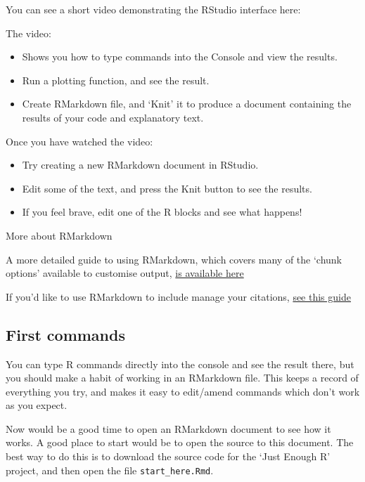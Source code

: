 \documentclass[]{article}
\providecommand{\tightlist}{%
  \setlength{\itemsep}{0pt}\setlength{\parskip}{0pt}}
\theoremstyle{definition}
\theoremstyle{definition}
\theoremstyle{definition}
\theoremstyle{remark}
\begin{document}
You can see a short video demonstrating the RStudio interface here:

The video:

\begin{itemize}
\tightlist
\item
  Shows you how to type commands into the Console and view the results.
\item
  Run a plotting function, and see the result.
\item
  Create RMarkdown file, and `Knit' it to produce a document containing
  the results of your code and explanatory text.
\end{itemize}

Once you have watched the video:

\begin{itemize}
\tightlist
\item
  Try creating a new RMarkdown document in RStudio.
\item
  Edit some of the text, and press the Knit button to see the results.
\item
  If you feel brave, edit one of the R blocks and see what happens!
\end{itemize}

More about RMarkdown

A more detailed guide to using RMarkdown, which covers many of the
`chunk options' available to customise output,
\href{http://cfss.uchicago.edu/block013_rmarkdown.html}{is available
here}

If you'd like to use RMarkdown to include manage your citations,
\href{http://rmarkdown.rstudio.com/authoring_bibliographies_and_citations.html}{see
this guide}

\subsection*{First commands}\label{first-commands}

You can type R commands directly into the console and see the result
there, but you should make a habit of working in an RMarkdown file. This
keeps a record of everything you try, and makes it easy to edit/amend
commands which don't work as you expect.

Now would be a good time to open an RMarkdown document to see how it
works. A good place to start would be to open the source to this
document. The best way to do this is to download the source code for the
`Just Enough R' project, and then open the file
\texttt{start\_here.Rmd}.
\end{document}
